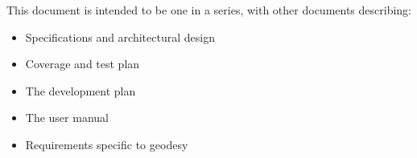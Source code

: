 This document is intended to be one in a series, with other documents describing:
\begin{itemize}
\item Specifications and architectural design
\item Coverage and test plan
\item The development plan
\item The user manual
\item Requirements specific to geodesy
\end{itemize}




%
%
%
%
%



%
%
